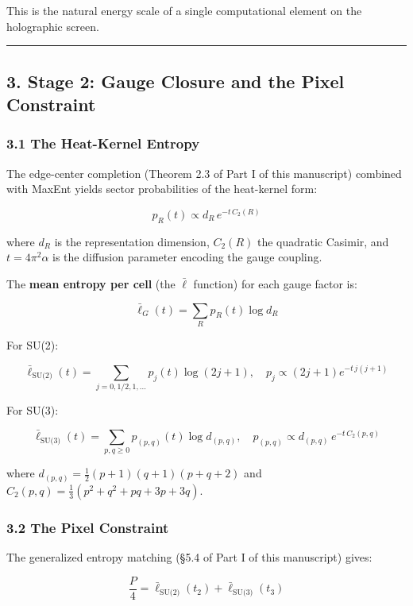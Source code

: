 This is the natural energy scale of a single computational element on the holographic screen.

\begin{center}\rule{0.5\linewidth}{0.5pt}\end{center}

\subsection{3. Stage 2: Gauge Closure and the Pixel Constraint}\label{3-stage-2-gauge-closure-and-the-pixel-constraint}

\subsubsection{3.1 The Heat-Kernel Entropy}\label{31-the-heat-kernel-entropy}

The edge-center completion (Theorem 2.3 of Part I of this manuscript) combined with MaxEnt yields sector probabilities of the heat-kernel form:

\[p_R(t) \propto d_R \, e^{-t \, C_2(R)}\]

where \(d_R\) is the representation dimension, \(C_2(R)\) the quadratic Casimir, and \(t = 4\pi^2 \alpha\) is the diffusion parameter encoding the gauge coupling.

The \textbf{mean entropy per cell} (the \(\bar{\ell}\) function) for each gauge factor is:

\[\bar{\ell}_G(t) = \sum_R p_R(t) \log d_R\]

For SU(2):

\[\bar{\ell}_{\text{SU(2)}}(t) = \sum_{j=0,1/2,1,...} p_j(t) \log(2j+1), \quad p_j \propto (2j+1) e^{-t \, j(j+1)}\]

For SU(3):

\[\bar{\ell}_{\text{SU(3)}}(t) = \sum_{p,q \geq 0} p_{(p,q)}(t) \log d_{(p,q)}, \quad p_{(p,q)} \propto d_{(p,q)} \, e^{-t \, C_2(p,q)}\]

where \(d_{(p,q)} = \frac{1}{2}(p+1)(q+1)(p+q+2)\) and \(C_2(p,q) = \frac{1}{3}(p^2 + q^2 + pq + 3p + 3q)\).

\subsubsection{3.2 The Pixel Constraint}\label{32-the-pixel-constraint}

The generalized entropy matching (§5.4 of Part I of this manuscript) gives:

\[\frac{P}{4} = \bar{\ell}_{\text{SU(2)}}(t_2) + \bar{\ell}_{\text{SU(3)}}(t_3)\]

